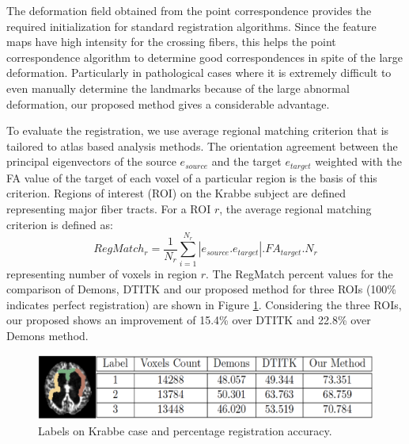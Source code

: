 \documentclass{llncs}
\begin{document}
The deformation field obtained from the point correspondence provides the required initialization for standard registration algorithms. Since the feature maps have high intensity for the crossing fibers, this helps the point correspondence algorithm to determine good correspondences in spite of the large deformation. Particularly in pathological cases where it is extremely difficult to even manually determine the landmarks because of the large abnormal deformation, our proposed method gives a considerable advantage.

To evaluate the registration, we use average regional matching criterion that is tailored to atlas based analysis methods. The orientation agreement between the principal eigenvectors of the source $e_{source}$ and the target $e_{target}$ weighted with the FA value of the target of each voxel of a particular region is the basis of this criterion. Regions of interest (ROI) on the Krabbe subject are defined representing major fiber tracts. For a ROI $r$, the average regional matching criterion is defined as: 
\begin{equation}
RegMatch_{r} = \frac{1}{N_{r}} \sum_{i=1}^{N_{r}} |e_{source}.e_{target}|.FA_{target}. N_{r}
\end{equation}
representing number of voxels in region $r$. The RegMatch percent values for the comparison of Demons, DTITK and our proposed method for three ROIs (100\% indicates perfect registration) are shown in Figure \ref{fig:Label_Table}. Considering the three ROIs, our proposed shows an improvement of 15.4\% over DTITK and 22.8\% over Demons method. 

\begin{figure}[htb]
\includegraphics[width=1.0\columnwidth]{images/Table_LabelMap.png}
\centering
\caption{Labels on Krabbe case and percentage registration accuracy.}
\label{fig:Label_Table}
\end{figure}
\end{document}
